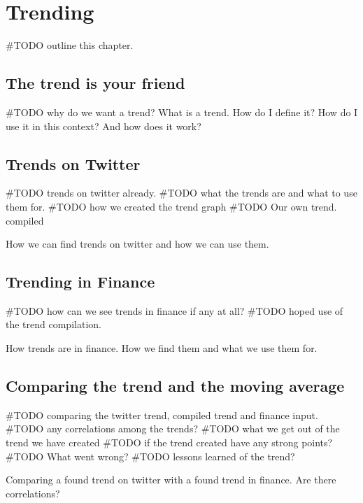 
\chapter{Trending}
#TODO outline this chapter. 
%

\section{The trend is your friend}
#TODO why do we want a trend?
What is a trend. How do I define it? How do I use it in this context? And how
does it work? 
%

\section{Trends on Twitter}
#TODO trends on twitter already.
#TODO what the trends are and what to use them for. 
#TODO how we created the trend graph
#TODO Our own trend. compiled
 
How we can find trends on twitter and how we can use them.
% 

\section{Trending in Finance}
#TODO how can we see trends in finance if any at all?
#TODO hoped use of the trend compilation. 

How trends are in finance. How we find them and what we use them for. 
%

\section{Comparing the trend and the moving average}
#TODO comparing the twitter trend, compiled trend and finance input. 
#TODO any correlations among the trends?
#TODO what we get out of the trend we have created
#TODO if the trend created have any strong points?
#TODO What went wrong?
#TODO lessons learned of the trend? 
 
Comparing a found trend on twitter with a found trend in finance. Are there
correlations?   
%
